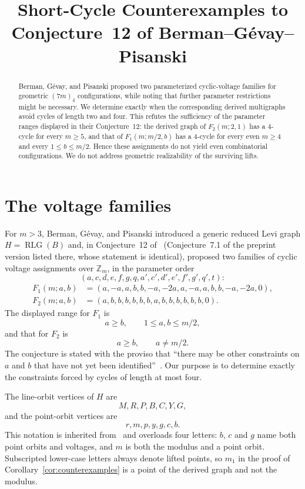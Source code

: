 \documentclass[11pt]{amsart}
\title[Short-cycle counterexamples]
{Short-Cycle Counterexamples to Conjecture~12 of
Berman--G\'evay--Pisanski}
\date{}
\theoremstyle{remark}
\newcommand{\Z}{\mathbb Z}
\begin{document}
\begin{abstract}
Berman, G\'evay, and Pisanski proposed two parameterized cyclic-voltage
families for geometric $(7m)_4$ configurations, while noting that further
parameter restrictions might be necessary. We determine exactly when the
corresponding derived multigraphs avoid cycles of length two and four. This
refutes the sufficiency of the parameter ranges displayed in their
Conjecture~12: the
derived graph of $F_2(m;2,1)$ has a $4$-cycle for every $m\ge5$, and that of
$F_1(m;m/2,b)$ has a $4$-cycle for every even $m\ge4$ and every
$1\le b\le m/2$. Hence these assignments do not yield even combinatorial
configurations. We do not address geometric realizability of the surviving
lifts.
\end{abstract}

\maketitle

\section{The voltage families}

For $m>3$, Berman, G\'evay, and Pisanski introduced a generic reduced Levi
graph $H=\operatorname{RLG}(B)$ and, in Conjecture~12 of~\cite{BGP}
(Conjecture~7.1 of the preprint version listed there, whose statement is
identical), proposed two families of cyclic voltage assignments over $\Z_m$,
in the parameter order
\[
(a,c,d,e,f,g,q,a',c',d',e',f',g',q',t):
\]
\begin{align*}
F_1(m;a,b)
 &= (a,-a,a,b,b,-a,-2a,
     a,-a,a,b,b,-a,-2a,0),\\
F_2(m;a,b)
 &= (a,b,b,b,b,b,b,
     a,b,b,b,b,b,b,0).
\end{align*}
The displayed range for $F_1$ is
\[
a\ge b,\qquad 1\le a,b\le m/2,
\]
and that for $F_2$ is
\[
a\ge b,\qquad a\ne m/2.
\]
The conjecture is stated with the proviso that ``there may be other
constraints on $a$ and $b$ that have not yet been identified''~\cite{BGP}.
Our purpose is to determine exactly the constraints forced by cycles of
length at most four.

The line-orbit vertices of $H$ are
\[
M,R,P,B,C,Y,G,
\]
and the point-orbit vertices are
\[
r,m,p,y,g,c,b.
\]
This notation is inherited from~\cite{BGP} and overloads four letters: $b$,
$c$ and $g$ name both point orbits and voltages, and $m$ is both the modulus
and a point orbit. Subscripted lower-case letters always denote lifted
points, so $m_1$ in the proof of Corollary~\ref{cor:counterexamples} is a
point of the derived graph and not the modulus.
\end{document}
